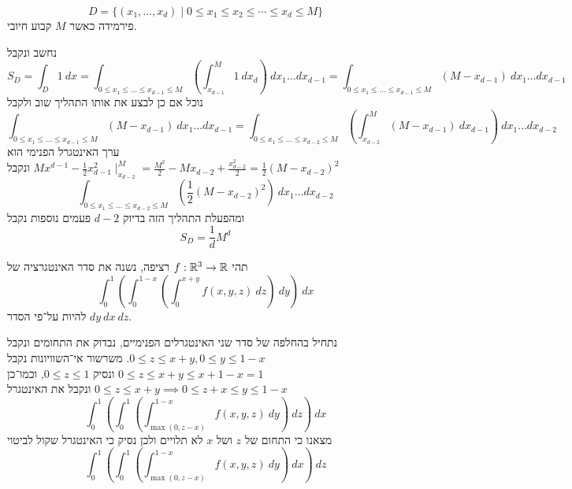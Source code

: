 \Subquestion{}
\[
	D = \{(x_1, \dots, x_d) \mid 0 \le x_1 \le x_2 \le \cdots \le x_d \le M \}
\]
פירמידה כאשר $M$ קבוע חיובי.

נחשב ונקבל
\[
	S_D
	= \int_D 1\ dx
	= \int_{0 \le x_1 \le \dots \le x_{d - 1} \le M} \left( \int_{x_{d - 1}}^M 1\ dx_d \right)\ dx_1 \dots dx_{d - 1}
	= \int_{0 \le x_1 \le \dots \le x_{d - 1} \le M} \left(M - x_{d - 1}\right)\ dx_1 \dots dx_{d - 1}
\]
נוכל אם כן לבצע את אותו התהליך שוב ולקבל
\[
	\int_{0 \le x_1 \le \dots \le x_{d - 1} \le M} \left(M - x_{d - 1}\right)\ dx_1 \dots dx_{d - 1}
	= \int_{0 \le x_1 \le \dots \le x_{d - 2} \le M} \left(\int_{x_{d - 2}}^M (M - x_{d - 1})\ dx_{d - 1} \right)\ dx_1 \dots dx_{d - 2}
\]
ערך האינטגרל הפנימי הוא $M x^{d - 1} - \frac{1}{2} x_{d - 1}^2 \mid_{x_{d - 2}}^M = \frac{M^2}{2} - M x_{d - 2} + \frac{x_{d - 2}^2}{2} = \frac{1}{2} {(M - x_{d - 2})}^2$ ונקבל
\[
	\int_{0 \le x_1 \le \dots \le x_{d - 2} \le M} \left( \frac{1}{2} {(M - x_{d - 2})}^2 \right)\ dx_1 \dots dx_{d - 2}
\]
ומהפעלת התהליך הזה בדיוק $d - 2$ פעמים נוספות נקבל
\[
	S_D = \frac{1}{d} M^d
\]

\Question{}
\Subquestion{}
תהי $f : \mathbb{R}^3 \to \mathbb{R}$ רציפה, נשנה את סדר האינטגרציה של
\[
	\int_{0}^{1} \left( \int_{0}^{1 - x} \left( \int_{0}^{x + y} f(x, y, z)\ dz \right)\ dy\right)\ dx
\]
להיות על־פי הסדר $dy\ dx\ dz$.

נתחיל בהחלפה של סדר שני האינטגרלים הפנימיים, נבדוק את התחומים ונקבל $0 \le z \le x + y, 0 \le y \le 1 - x$.
משרשור אי־השוויונות נקבל $0 \le z \le x + y \le x + 1 - x = 1$ ונסיק $0 \le z \le 1$, וכמו־כן $0 \le z \le x + y \implies 0 \le z + x \le y \le 1 - x$ ונקבל את האינטגרל
\[
	\int_{0}^{1} \left( \int_{0}^{1} \left( \int_{\max(0, z - x)}^{1 - x} f(x, y, z)\ dy \right)\ dz\right)\ dx
\]
מצאנו כי התחום של $z$ ושל $x$ לא תלויים ולכן נסיק כי האינטגרל שקול לביטוי
\[
	\int_{0}^{1} \left( \int_{0}^{1} \left( \int_{\max(0, z - x)}^{1 - x} f(x, y, z)\ dy \right)\ dx\right)\ dz
\]

